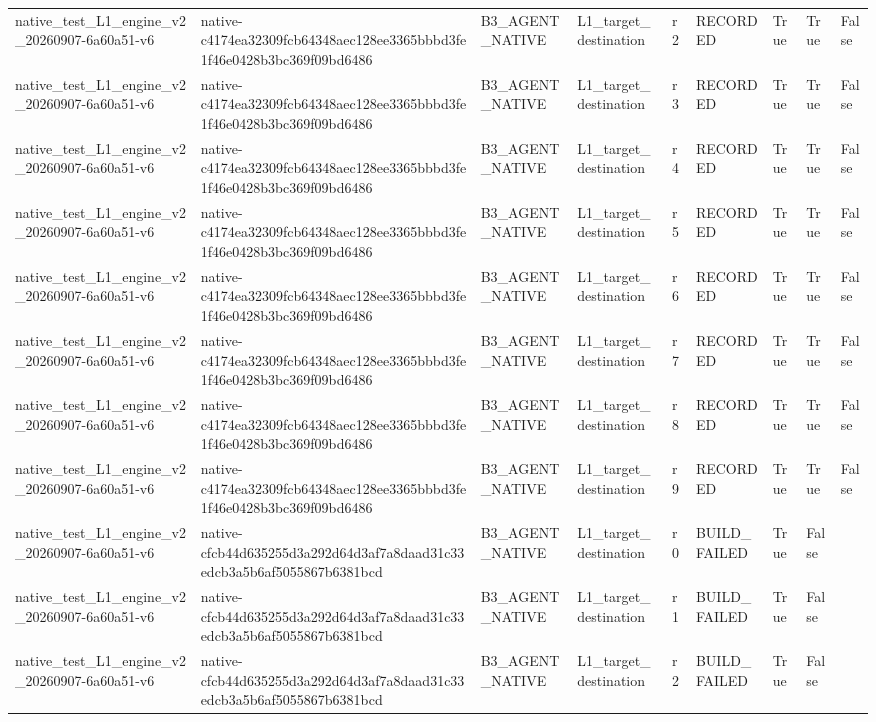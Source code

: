 \begin{tabular}{lllllllll}
native\_test\_L1\_engine\_v2\_20260907-6a60a51-v6 & native-c4174ea32309fcb64348aec128ee3365bbbd3fe1f46e0428b3bc369f09bd6486 & B3\_AGENT\_NATIVE & L1\_target\_destination & r2 & RECORDED & True & True & False \\
native\_test\_L1\_engine\_v2\_20260907-6a60a51-v6 & native-c4174ea32309fcb64348aec128ee3365bbbd3fe1f46e0428b3bc369f09bd6486 & B3\_AGENT\_NATIVE & L1\_target\_destination & r3 & RECORDED & True & True & False \\
native\_test\_L1\_engine\_v2\_20260907-6a60a51-v6 & native-c4174ea32309fcb64348aec128ee3365bbbd3fe1f46e0428b3bc369f09bd6486 & B3\_AGENT\_NATIVE & L1\_target\_destination & r4 & RECORDED & True & True & False \\
native\_test\_L1\_engine\_v2\_20260907-6a60a51-v6 & native-c4174ea32309fcb64348aec128ee3365bbbd3fe1f46e0428b3bc369f09bd6486 & B3\_AGENT\_NATIVE & L1\_target\_destination & r5 & RECORDED & True & True & False \\
native\_test\_L1\_engine\_v2\_20260907-6a60a51-v6 & native-c4174ea32309fcb64348aec128ee3365bbbd3fe1f46e0428b3bc369f09bd6486 & B3\_AGENT\_NATIVE & L1\_target\_destination & r6 & RECORDED & True & True & False \\
native\_test\_L1\_engine\_v2\_20260907-6a60a51-v6 & native-c4174ea32309fcb64348aec128ee3365bbbd3fe1f46e0428b3bc369f09bd6486 & B3\_AGENT\_NATIVE & L1\_target\_destination & r7 & RECORDED & True & True & False \\
native\_test\_L1\_engine\_v2\_20260907-6a60a51-v6 & native-c4174ea32309fcb64348aec128ee3365bbbd3fe1f46e0428b3bc369f09bd6486 & B3\_AGENT\_NATIVE & L1\_target\_destination & r8 & RECORDED & True & True & False \\
native\_test\_L1\_engine\_v2\_20260907-6a60a51-v6 & native-c4174ea32309fcb64348aec128ee3365bbbd3fe1f46e0428b3bc369f09bd6486 & B3\_AGENT\_NATIVE & L1\_target\_destination & r9 & RECORDED & True & True & False \\
native\_test\_L1\_engine\_v2\_20260907-6a60a51-v6 & native-cfcb44d635255d3a292d64d3af7a8daad31c33edcb3a5b6af5055867b6381bcd & B3\_AGENT\_NATIVE & L1\_target\_destination & r0 & BUILD\_FAILED & True & False &  \\
native\_test\_L1\_engine\_v2\_20260907-6a60a51-v6 & native-cfcb44d635255d3a292d64d3af7a8daad31c33edcb3a5b6af5055867b6381bcd & B3\_AGENT\_NATIVE & L1\_target\_destination & r1 & BUILD\_FAILED & True & False &  \\
native\_test\_L1\_engine\_v2\_20260907-6a60a51-v6 & native-cfcb44d635255d3a292d64d3af7a8daad31c33edcb3a5b6af5055867b6381bcd & B3\_AGENT\_NATIVE & L1\_target\_destination & r2 & BUILD\_FAILED & True & False &  \\

\end{tabular}
